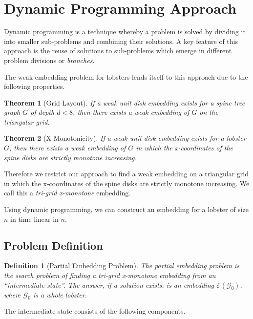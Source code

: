 \documentclass[draft,final]{vutinfth} %
\newtheorem{theorem}{Theorem}
\newtheorem{definition}{Definition}
\begin{document}
\section{Dynamic Programming Approach}

Dynamic programming is a technique whereby a problem is solved by dividing it into smaller sub-problems and combining their solutions.
A key feature of this approach is the reuse of solutions to sub-problems which emerge in different problem divisions or \emph{branches}.

The weak embedding problem for lobsters lends itself to this approach due to the following properties.

\begin{theorem}[Grid Layout]
If a weak unit disk embedding exists for a spine tree graph $G$ of depth $d<8$, then there exists a weak embedding of $G$ on the triangular grid.
\end{theorem}

\begin{theorem}[X-Monotonicity]
If a weak unit disk embedding exists for a lobster $G$, then there exists a weak embedding of $G$ in which the x-coordinates of the spine disks are strictly monotone increasing.
\end{theorem}

Therefore we restrict our approach to find a weak embedding on a triangular grid in which the x-coordinates of the spine disks are strictly monotone increasing. We call this a \emph{tri-grid x-monotone} embedding.

Using dynamic programming, we can construct an embedding for a lobster of size $n$ in time linear in $n$.

\subsection{Problem Definition}

\begin{definition}[Partial Embedding Problem]
The partial embedding problem is the search problem of finding a tri-grid x-monotone embedding from an ``intermediate state''. The answer, if a solution exists, is an embedding $\mathcal E(\mathcal G_0)$, where $\mathcal G_0$ is a whole lobster.
\end{definition}

The intermediate state consists of the following components.
\end{document}
